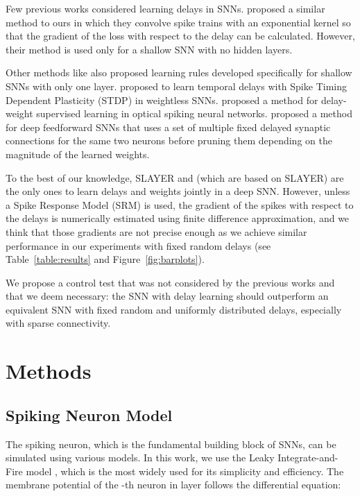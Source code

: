 \documentclass{article} \usepackage{iclr2024_conference,times}
\begin{document}
Few previous works considered learning delays in SNNs. \citet{Delay_Learning_Kernel} proposed a similar method to ours in which they convolve spike trains with an exponential kernel so that the gradient of the loss with respect to the delay can be calculated. However, their method is used only for a shallow SNN with no hidden layers. 

Other methods like \citet{related_delays1,related_delays1bis, related_delays2, related_delays3} also proposed learning rules developed specifically for shallow SNNs with only one layer. \citet{related_delays4} proposed to learn temporal delays with Spike Timing Dependent Plasticity (STDP) in weightless SNNs. \citet{DW_photonic} proposed a method for delay-weight supervised learning in optical spiking neural networks. \citet{iscas} proposed a method for deep feedforward SNNs that uses a set of multiple fixed delayed synaptic connections for the same two neurons before pruning them depending on the magnitude of the learned weights.

To the best of our knowledge, SLAYER \citep{slayer} and \citet{sun22, sun23, sun23-2} (which are based on SLAYER) are the only ones to learn delays and weights jointly in a deep SNN. However, unless a Spike Response Model (SRM) \citep{srm} is used, the gradient of the spikes with respect to the delays is numerically estimated using finite difference approximation, and we think that those gradients are not precise enough as we achieve similar performance in our experiments with fixed random delays (see Table~\ref{table:results} and Figure~\ref{fig:barplots}).

We propose a control test that was not considered by the previous works and that we deem necessary: the SNN with delay learning should outperform an equivalent SNN with fixed random and uniformly distributed delays, especially with sparse connectivity.




















\section{Methods}
\subsection{Spiking Neuron Model}
\label{methods:spiking}
The spiking neuron, which is the fundamental building block of SNNs, can be simulated using various models. In this work, we use the Leaky Integrate-and-Fire model \citep{gerstnerkistler2002}, which is the most widely used for its simplicity and efficiency. The membrane potential  of the -th neuron in layer  follows the differential equation: 
\end{document}
